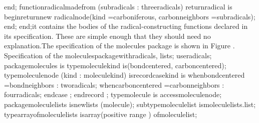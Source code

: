    \tyxtstxbf[]end\tyxtstxendbf[];
   \tyxtstxbf[]function\tyxtstxendbf[] radical\Symuns[]made\Symuns[]from (subradicals : three\Symuns[]radicals)
      \tyxtstxbf[]return\tyxtstxendbf[] radical \tyxtstxbf[]is%
\tyxtstxendbf[]
   \tyxtstxbf[]begin\tyxtstxendbf[]
      \tyxtstxbf[]return\tyxtstxendbf[] \tyxtstxbf[]new%
\tyxtstxendbf[] radical\Symuns[]node\rsquo[](kind             =\Symgt[] carboniferous,
                               carbon\Symuns[]neighbors =\Symgt[] subradicals);
   \tyxtstxbf[]end\tyxtstxendbf[];
\tyxtstxbf[]end\tyxtstxendbf[];\Endcomp[]
\EndParbox[]
\FgEndblock[]
 it contains the bodies of the radical-constructing functions declared
in its specification. These are simple enough that they should need
no explanation.\Endpara[]
\Para[]The specification of the \tyxffmxmono[]molecules%
\tyxffmxendmono[] package is shown in Figure .
\Parbox[]
Specification of the %
\tyxffmxmono[]molecules\tyxffmxendmono[] package\FgEndcap[]
\Comp[]\tyxtstxbf[]with\tyxtstxendbf[] radicals, lists;
\tyxtstxbf[]use\tyxtstxendbf[]  radicals;
\tyxtstxbf[]package\tyxtstxendbf[] molecules \tyxtstxbf[]is%
\tyxtstxendbf[]
   \tyxtstxbf[]type\tyxtstxendbf[] molecule\Symuns[]kind %
\tyxtstxbf[]is\tyxtstxendbf[] (bond\Symuns[]centered, carbon\Symuns[]centered);
   \tyxtstxbf[]type\tyxtstxendbf[] molecule\Symuns[]node (kind : molecule\Symuns[]kind) %
\tyxtstxbf[]is\tyxtstxendbf[] \tyxtstxbf[]record\tyxtstxendbf[]
      \tyxtstxbf[]case\tyxtstxendbf[] kind \tyxtstxbf[]is%
\tyxtstxendbf[]
      \tyxtstxbf[]when\tyxtstxendbf[] bond\Symuns[]centered =\Symgt[]
         bond\Symuns[]neighbors : two\Symuns[]radicals;
      \tyxtstxbf[]when\tyxtstxendbf[] carbon\Symuns[]centered =\Symgt[]
         carbon\Symuns[]neighbors : four\Symuns[]radicals;
      \tyxtstxbf[]end\tyxtstxendbf[] \tyxtstxbf[]case%
\tyxtstxendbf[];
   \tyxtstxbf[]end\tyxtstxendbf[] \tyxtstxbf[]record%
\tyxtstxendbf[];
   \tyxtstxbf[]type\tyxtstxendbf[] molecule \tyxtstxbf[]is%
\tyxtstxendbf[] \tyxtstxbf[]access\tyxtstxendbf[] molecule\Symuns[]node;
   \tyxtstxbf[]package\tyxtstxendbf[] molecule\Symuns[]lists %
\tyxtstxbf[]is\tyxtstxendbf[] \tyxtstxbf[]new\tyxtstxendbf[] lists (molecule);
   \tyxtstxbf[]subtype\tyxtstxendbf[] molecule\Symuns[]list  %
\tyxtstxbf[]is\tyxtstxendbf[] molecule\Symuns[]lists.list;
   \tyxtstxbf[]type\tyxtstxendbf[] array\Symuns[]of\Symuns[]molecule\Symuns[]lists %
\tyxtstxbf[]is\tyxtstxendbf[]
      \tyxtstxbf[]array\tyxtstxendbf[] (positive \tyxtstxbf[]range%
\tyxtstxendbf[] \Symlt[]\Symgt[]) \tyxtstxbf[]of\tyxtstxendbf[] molecule\Symuns[]list;
